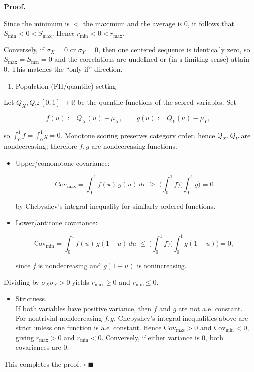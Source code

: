 \documentclass[
  12pt,
]{article}
\providecommand{\tightlist}{%
  \setlength{\itemsep}{0pt}\setlength{\parskip}{0pt}}
\theoremstyle{plain}
\theoremstyle{definition}
\renewenvironment{proof}
   {\par\noindent\textbf{Proof.}\ }
   {\hfill$\blacksquare$\par}
\theoremstyle{remark}
\begin{document}
\begin{proof}
\begin{itemize}
  Since the minimum is \(<\) the maximum and the average is \(0\), it
  follows that \(S_{\min}<0<S_{\max}\). Hence \(r_{\min}<0<r_{\max}\).

  Conversely, if \(\sigma_X=0\) or \(\sigma_Y=0\), then one centered
  sequence is identically zero, so \(S_{\max}=S_{\min}=0\) and the
  correlations are undefined or (in a limiting sense) attain 0. This
  matches the ``only if'' direction.
\end{itemize}

\begin{enumerate}
\def\labelenumi{\Alph{enumi})}
\setcounter{enumi}{1}
\tightlist
\item
  Population (FH/quantile) setting
\end{enumerate}

Let \(Q_X, Q_Y : [0,1]\to\mathbb{R}\) be the quantile functions of the
scored variables. Set

\[f(u):=Q_X(u)-\mu_X,\qquad g(u):=Q_Y(u)-\mu_Y,\]

so \(\int_0^1 f=\int_0^1 g=0\). Monotone scoring preserves category
order, hence \(Q_X, Q_Y\) are nondecreasing; therefore \(f, g\) are
nondecreasing functions.

\begin{itemize}
\item
  Upper/comonotone covariance:

  \[\mathrm{Cov}_{\max}=\int_0^1 f(u)\,g(u)\,du \;\ge\; \Big(\int_0^1 f\Big)\Big(\int_0^1 g\Big)=0\]

  by Chebyshev's integral inequality for similarly ordered functions.
\item
  Lower/antitone covariance:

  \[\mathrm{Cov}_{\min}=\int_0^1 f(u)\,g(1-u)\,du \;\le\; \Big(\int_0^1 f\Big)\Big(\int_0^1 g(1-u)\Big)=0,\]

  since \(f\) is nondecreasing and \(g(1-u)\) is nonincreasing.
\end{itemize}

Dividing by \(\sigma_X\sigma_Y>0\) yields \(r_{\max}\ge 0\) and
\(r_{\min}\le 0\).

\begin{itemize}
\tightlist
\item
  Strictness.\\
  If both variables have positive variance, then \(f\) and \(g\) are not
  a.e. constant. For nontrivial nondecreasing \(f,g\), Chebyshev's
  integral inequalities above are strict unless one function is a.e.
  constant. Hence \(\mathrm{Cov}_{\max}>0\) and
  \(\mathrm{Cov}_{\min}<0\), giving \(r_{\max}>0\) and \(r_{\min}<0\).
  Conversely, if either variance is \(0\), both covariances are \(0\).
\end{itemize}

This completes the proof. \(\square\)
\end{proof}
\end{document}
